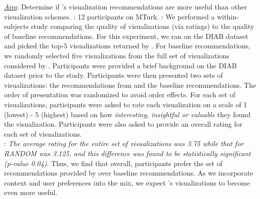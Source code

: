 % 

{\it \underline{Aim}}: Determine if \SeeDB's visualization 
recommendations 
are more useful than other visualization schemes.
: 12 participants on MTurk.
: We performed a within-subjects study comparing the quality of \SeeDB visualizations (via ratings) to the quality of baseline recommendations.
For this experiment, we ran \SeeDB on the DIAB dataset and picked the top-$5$ visualizations returned by \SeeDB.
For baseline recommendations, we randomly selected five visualizations from
the full set of visualizations considered by \SeeDB.
Participants were provided a brief background on the DIAB dataset prior to the study.
Participants were then presented two sets of visualizations: the recommendations from \SeeDB and the baseline recommendations. 
The order of presentation was randomized to avoid order effects.
For each set of visualizations, participants were asked to rate each visualization on a scale of 1 (lowest) - 5 (highest) based on how {\it interesting, insightful or valuable} they found the visualization.
Participants were also asked to provide an overall rating for each set of visualizations.\\
: 
{\em The average rating for the entire set of \SeeDB visualizations was 3.75 while that for RANDOM was 3.125, and this difference was found to be statistically significant (p-value 0.04)}. 
Thus, we find that overall, participants prefer the set of recommendations provided by \SeeDB over baseline recommendations. 
As we incorporate context and user preferences
into the mix, we expect \SeeDB's visualizations
to become even more useful.


